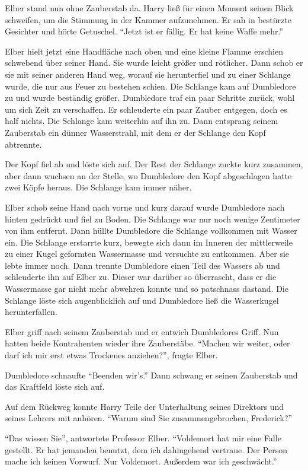Elber stand nun ohne Zauberstab da. Harry ließ für einen Moment seinen Blick schweifen, um die Stimmung in der Kammer aufzunehmen. Er sah in bestürzte Gesichter und hörte Getuschel. \enquote{Jetzt ist er fällig. Er hat keine Waffe mehr.}

Elber hielt jetzt eine Handfläche nach oben und eine kleine Flamme erschien schwebend über seiner Hand. Sie wurde leicht größer und rötlicher. Dann schob er sie mit seiner anderen Hand weg, worauf sie herunterfiel und zu einer Schlange wurde, die nur aus Feuer zu bestehen schien. Die Schlange kam auf Dumbledore zu und wurde beständig größer. Dumbledore traf ein paar Schritte zurück, wohl um sich Zeit zu verschaffen. Er schleuderte ein paar Zauber entgegen, doch es half nichts. Die Schlange kam weiterhin auf ihn zu. Dann entsprang seinem Zauberstab ein dünner Wasserstrahl, mit dem er der Schlange den Kopf abtrennte.

Der Kopf fiel ab und löste sich auf. Der Rest der Schlange zuckte kurz zusammen, aber dann wuchsen an der Stelle, wo Dumbledore den Kopf abgeschlagen hatte zwei Köpfe heraus. Die Schlange kam immer näher.

Elber schob seine Hand nach vorne und kurz darauf wurde Dumbledore nach hinten gedrückt und fiel zu Boden. Die Schlange war nur noch wenige Zentimeter von ihm entfernt. Dann hüllte Dumbledore die Schlange vollkommen mit Wasser ein. Die Schlange erstarrte kurz, bewegte sich dann im Inneren der mittlerweile zu einer Kugel geformten Wassermasse und versuchte zu entkommen. Aber sie lebte immer noch. Dann trennte Dumbledore einen Teil des Wassers ab und schleuderte ihn auf Elber zu. Dieser war darüber so überrascht, dass er die Wassermasse gar nicht mehr abwehren konnte und so patschnass dastand. Die Schlange löste sich augenblicklich auf und Dumbledore ließ die Wasserkugel herunterfallen.

Elber griff nach seinem Zauberstab und er entwich Dumbledores Griff. Nun hatten beide Kontrahenten wieder ihre Zauberstäbe. \enquote{Machen wir weiter, oder darf ich mir erst etwas Trockenes anziehen?}, fragte Elber.

Dumbledore schnaufte \enquote{Beenden wir’s.} Dann schwang er seinen Zauberstab und das Kraftfeld löste sich auf.

Auf dem Rückweg konnte Harry Teile der Unterhaltung seines Direktors und seines Lehrers mit anhören. \enquote{Warum sind Sie zusammengebrochen, Frederick?}

\enquote{Das wissen Sie}, antwortete Professor Elber. \enquote{Voldemort hat mir eine Falle gestellt. Er hat jemanden benutzt, dem ich dahingehend vertraue. Der Person mache ich keinen Vorwurf. Nur Voldemort. Außerdem war ich geschwächt.}

